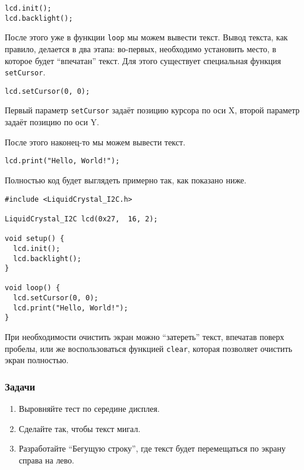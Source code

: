 \documentclass[../sparc.tex]{subfiles}
\begin{document}
\begin{verbatim}
lcd.init();
lcd.backlight();
\end{verbatim}

После этого уже в функции \texttt{loop} мы можем вывести текст.  Вывод текста,
как правило, делается в два этапа: во-первых, необходимо установить место, в
которое будет ``впечатан'' текст.  Для этого существует специальная функция
\texttt{setCursor}.

\begin{verbatim}
lcd.setCursor(0, 0);
\end{verbatim}

Первый параметр \texttt{setCursor} задаёт позицию курсора по оси X, второй
параметр задаёт позицию по оси Y.

После этого наконец-то мы можем вывести текст.

\begin{verbatim}
lcd.print("Hello, World!");
\end{verbatim}

Полностью код будет выглядеть примерно так, как показано ниже.

\begin{verbatim}
#include <LiquidCrystal_I2C.h>

LiquidCrystal_I2C lcd(0x27,  16, 2);

void setup() {
  lcd.init();
  lcd.backlight();
}

void loop() {
  lcd.setCursor(0, 0);
  lcd.print("Hello, World!");
}
\end{verbatim}

При необходимости очистить экран можно ``затереть'' текст, впечатав поверх
пробелы, или же воспользоваться функцией \texttt{clear}, которая позволяет
очистить экран полностью.

\subsubsection{Задачи}
\begin{enumerate}
\item Выровняйте тест по середине дисплея.
\item Сделайте так, чтобы текст мигал.
\item Разработайте ``Бегущую строку'', где текст будет перемещаться по экрану
  справа на лево.
\end{enumerate}
\end{document}
